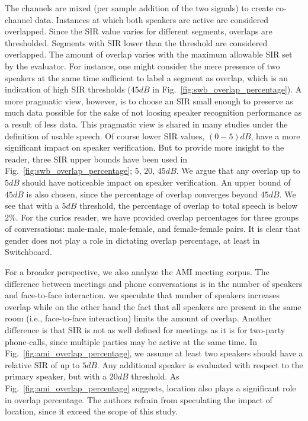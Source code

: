 The channels are mixed (per sample addition of the two signals) to create co-channel data. 
Instances at which both speakers are active are considered overlapped. 
Since the SIR value varies for different segments, overlaps are thresholded. 
Segments with SIR lower than the threshold are considered overlapped.
The amount of overlap varies with the maximum allowable SIR set by the evaluator. 
For instance, one might consider the mere presence of two speakers at the same time sufficient to label a segment as overlap, which is an indication of high SIR thresholds ($45dB$ in Fig.~\ref{fig:swb_overlap_percentage}). 
A more pragmatic view, however, is to choose an SIR small enough to preserve as much data possible for the sake of not loosing speaker recognition performance as a result of less data. 
This pragmatic view is shared in many studies under the definition of usable speech. 
Of course lower SIR values, $(0-5) dB$, have a more significant impact on speaker verification. But to provide more insight to the reader, three SIR upper bounds have been used in Fig.~\ref{fig:swb_overlap_percentage}; $5$, $20$, $45dB$. 
We argue that any overlap up to $5dB$ should have noticeable impact on speaker verification. 
An upper bound of $45dB$ is also chosen, since the percentage of overlap converges beyond $45dB$. 
We see that with a $5dB$ threshold, the percentage of overlap to total speech is below $2\%$. 
For the curios reader, we have provided overlap percentages for three groups of conversations: male-male, male-female, and female-female pairs. 
It is clear that gender does not play a role in dictating overlap percentage, at least in Switchboard.  

For a broader perspective, we also analyze the AMI meeting corpus. 
The difference between meetings and phone conversations is in the number of speakers and face-to-face interaction. 
we speculate that number of speakers increases overlap while on the other hand the fact that all speakers are present in the same room (i.e., face-to-face interaction) limits the amount of overlap. 
Another difference is that SIR is not as well defined for meetings as it is for two-party phone-calls, since multiple parties may be active at the same time. 
In Fig.~\ref{fig:ami_overlap_percentage}, we assume at least two speakers should have a relative SIR of up to $5dB$. 
Any additional speaker is evaluated with respect to the primary speaker, but with a $20dB$ threshold. 
As Fig.~\ref{fig:ami_overlap_percentage} suggests, location also plays a significant role in overlap percentage. 
The authors refrain from speculating the impact of location, since it exceed the scope of this study. 


